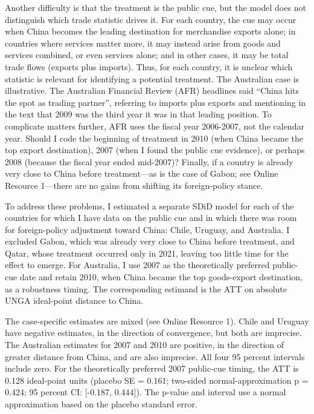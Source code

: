 \documentclass[referee,pdflatex,sn-basic]{sn-jnl}
\theoremstyle{thmstylethree}
\begin{document}
Another difficulty is that the treatment is the public cue, but the model does not distinguish which trade statistic drives it. For each country, the cue may occur when China becomes the leading destination for merchandise exports alone; in countries where services matter more, it may instead arise from goods and services combined, or even services alone; and in other cases, it may be total trade flows (exports plus imports). Thus, for each country, it is unclear which statistic is relevant for identifying a potential treatment. The Australian case is illustrative. The Australian Financial Review (AFR) headlines said ``China hits the spot as trading partner'', referring to imports plus exports and mentioning in the text that 2009 was the third year it was in that leading position. To complicate matters further, AFR uses the fiscal year 2006-2007, not the calendar year. Should I code the beginning of treatment in 2010 (when China became the top export destination), 2007 (when I found the public cue evidence), or perhaps 2008 (because the fiscal year ended mid-2007)? Finally, if a country is already very close to China before treatment---as is the case of Gabon; see Online Resource 1---there are no gains from shifting its foreign-policy stance.

To address these problems, I estimated a separate SDiD model for each of the countries for which I have data on the public cue and in which there was room for foreign-policy adjustment toward China: Chile, Uruguay, and Australia. I excluded Gabon, which was already very close to China before treatment, and Qatar, whose treatment occurred only in 2021, leaving too little time for the effect to emerge. For Australia, I use 2007 as the theoretically preferred public-cue date and retain 2010, when China became the top goods-export destination, as a robustness timing. The corresponding estimand is the ATT on absolute UNGA ideal-point distance to China.

The case-specific estimates are mixed (see Online Resource 1). Chile and Uruguay have negative estimates, in the direction of convergence, but both are imprecise. The Australian estimates for 2007 and 2010 are positive, in the direction of greater distance from China, and are also imprecise. All four 95 percent intervals include zero. For the theoretically preferred 2007 public-cue timing, the ATT is 0.128 ideal-point units (placebo SE = 0.161; two-sided normal-approximation p = 0.424; 95 percent CI: {[}-0.187, 0.444{]}). The p-value and interval use a normal approximation based on the placebo standard error.
\end{document}
